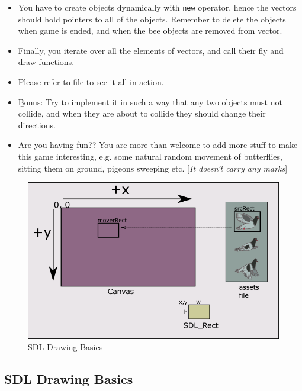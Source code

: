 \documentclass[a4paper,12pt]{article}
\begin{document}
\begin{itemize}
	 	\item You have to create objects dynamically with \texttt{new} operator, hence the vectors should hold pointers to all of the objects. Remember to delete the objects when game is ended, and when the bee objects are removed from vector.
	 	
	 	\item Finally, you iterate over all the elements of vectors, and call their fly and draw functions.
	 	
	 	
	 	\item Please refer to  file to see it all in action.
	 	
	 	\item \b{Bonus}: Try to implement it in such a way that any two objects must not collide, and when they are about to collide they should change their directions.
	 	
	 	\item Are you having fun?? You are more than welcome to add more stuff to make this game interesting, e.g. some natural random movement of butterflies, sitting them on ground, pigeons sweeping etc. [\textit{It doesn't carry any marks}]
	 \end{itemize}
 

	\begin{figure}
		\includegraphics[width=\linewidth]{sdlDrawing}
		\caption{SDL Drawing Basics}
		\label{fig:sdlDrawing}
	\end{figure}  

	
	
	\subsection{SDL Drawing Basics}
	
\end{document}
